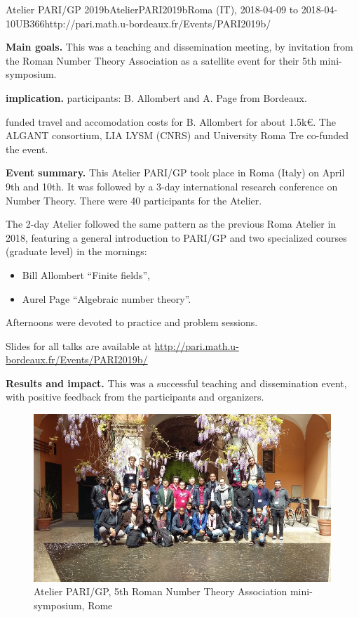 \begin{event}{Atelier PARI/GP 2019b}{AtelierPARI2019b}{Roma (IT),
2018-04-09 to 2018-04-10}{UB}{36}{6}{http://pari.math.u-bordeaux.fr/Events/PARI2019b/}

\textbf{Main goals.} This was a teaching and dissemination meeting, by
invitation from the Roman Number Theory Association as a satellite
event for their 5th mini-symposium.

\textbf{\ODK implication.} \ODK participants: B. Allombert and A. Page from
Bordeaux.

\ODK funded travel and accomodation costs for B. Allombert for about
  1.5k\euro. The ALGANT consortium, LIA LYSM (CNRS) and University Roma Tre
  co-funded the event.

\textbf{Event summary.} This Atelier PARI/GP took place in Roma (Italy) on
April 9th and 10th.  It was followed by a 3-day international research
conference on Number Theory. There were 40 participants for the
Atelier.

The 2-day Atelier followed the same pattern as the previous Roma Atelier
in 2018,
featuring a general introduction to PARI/GP and two
  specialized courses (graduate level) in the mornings:
\begin{itemize}
\item Bill Allombert ``Finite fields'',
\item Aurel Page ``Algebraic number theory''.
\end{itemize}
Afternoons were devoted to practice and problem sessions.

Slides for all talks are available at
\url{http://pari.math.u-bordeaux.fr/Events/PARI2019b/}

\textbf{Results and impact.} This was a successful teaching and dissemination
event, with positive feedback from the participants and organizers.

\begin{figure}[ht]
  \includegraphics[width=.75\textwidth]{pari2019b.jpg}
  \caption*{Atelier PARI/GP, 5th Roman Number Theory Association mini-symposium, Rome}
\end{figure}
\end{event}
